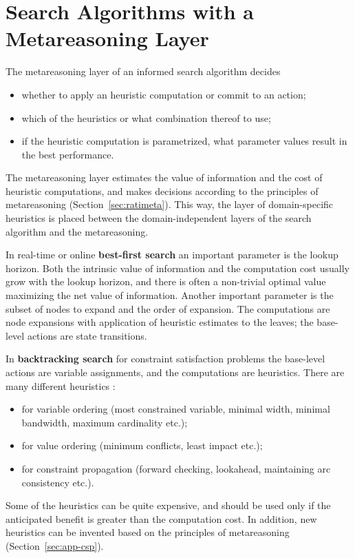 \section{Search Algorithms
  with a Metareasoning Layer}

The metareasoning layer of an informed search algorithm decides
\begin{itemize}
\item whether to apply an heuristic computation or commit to an action;
\item which of the heuristics or what combination thereof to use;
\item if the heuristic computation is parametrized, what parameter values
  result in the best performance.
\end{itemize}
The metareasoning layer estimates the value of information and the
cost of heuristic computations, and makes decisions according to
the principles of metareasoning (Section~\ref{sec:ratimeta}). This
way, the layer of domain-specific heuristics is placed between the
domain-independent layers of the search algorithm and the
metareasoning.

In real-time or online {\bf best-first search} an important parameter
is the lookup horizon. Both the intrinsic value of information and the
computation cost usually grow with the lookup horizon, and there is
often a non-trivial optimal value maximizing the net value of
information. Another important parameter is the subset of nodes to
expand and the order of expansion. The computations are node
expansions with application of heuristic estimates to the leaves; the
base-level actions are state transitions.

In {\bf backtracking search} for constraint satisfaction problems
the base-level actions are variable assignments, and the computations are
heuristics.  There are many different heuristics \cite{Tsang.csp}:
\begin{itemize}
\item for variable ordering (most constrained variable, minimal width,
  minimal bandwidth, maximum cardinality etc.);
\item for value ordering (minimum conflicts, least impact etc.);
\item for constraint propagation (forward checking, lookahead, maintaining arc
  consistency etc.).
\end{itemize}
Some of the heuristics can be quite expensive, and should be used only
if the anticipated benefit is greater than the computation
cost. In addition, new heuristics can be invented based on the
principles of metareasoning (Section~\ref{sec:app-csp}).

